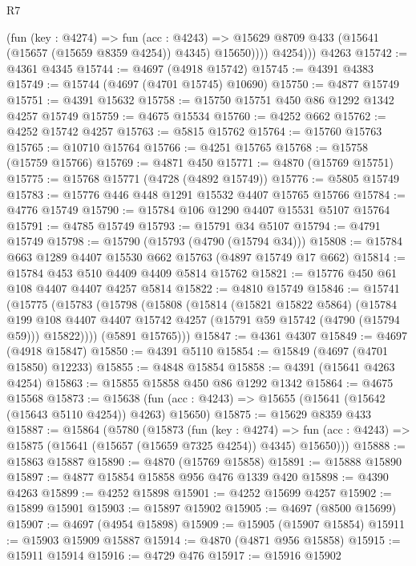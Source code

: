 \begin{lexlean}{R7}
\begin{coremodule}
              (fun (key : @4274) =>
              fun (acc : @4243) =>
              @15629 @8709 @433 (@15641 (@15657 (@15659 @8359 @4254)) @4345) @15650))))
          @4254)))
    @4263
@15742 := @4361 @4345
@15744 := @4697 (@4918 @15742)
@15745 := @4391 @4383
@15749 := @15744 (@4697 (@4701 @15745) @10690)
@15750 := @4877 @15749
@15751 := @4391 @15632
@15758 := @15750 @15751 @450 @86 @1292 @1342 @4257 @15749
@15759 := @4675 @15534
@15760 := @4252 @662
@15762 := @4252 @15742 @4257
@15763 := @5815 @15762
@15764 := @15760 @15763
@15765 := @10710 @15764
@15766 := @4251 @15765
@15768 := @15758 (@15759 @15766)
@15769 := @4871 @450
@15771 := @4870 (@15769 @15751)
@15775 := @15768 @15771 (@4728 (@4892 @15749))
@15776 := @5805 @15749
@15783 := @15776 @446 @448 @1291 @15532 @4407 @15765 @15766
@15784 := @4776 @15749
@15790 := @15784 @106 @1290 @4407 @15531 @5107 @15764
@15791 := @4785 @15749
@15793 := @15791 @34 @5107
@15794 := @4791 @15749
@15798 := @15790 (@15793 (@4790 (@15794 @34)))
@15808 := @15784 @663 @1289 @4407 @15530 @662 @15763 (@4897 @15749 @17 @662)
@15814 := @15784 @453 @510 @4409 @4409 @5814 @15762
@15821 := @15776 @450 @61 @108 @4407 @4407 @4257 @5814
@15822 := @4810 @15749
@15846 := @15741
    (@15775
      (@15783
        (@15798
          (@15808
            (@15814
              (@15821 @15822 @5864)
              (@15784
                @199
                @108
                @4407
                @4407
                @15742
                @4257
                (@15791 @59 @15742 (@4790 (@15794 @59)))
                @15822))))
        (@5891 @15765)))
@15847 := @4361 @4307
@15849 := @4697 (@4918 @15847)
@15850 := @4391 @5110
@15854 := @15849 (@4697 (@4701 @15850) @12233)
@15855 := @4848 @15854
@15858 := @4391 (@15641 @4263 @4254)
@15863 := @15855 @15858 @450 @86 @1292 @1342
@15864 := @4675 @15568
@15873 := @15638 (fun (acc : @4243) => @15655 (@15641 (@15642 (@15643 @5110 @4254)) @4263) @15650)
@15875 := @15629 @8359 @433
@15887 := @15864
    (@5780
      (@15873
        (fun (key : @4274) =>
        fun (acc : @4243) => @15875 (@15641 (@15657 (@15659 @7325 @4254)) @4345) @15650)))
@15888 := @15863 @15887
@15890 := @4870 (@15769 @15858)
@15891 := @15888 @15890
@15897 := @4877 @15854 @15858 @956 @476 @1339 @420
@15898 := @4390 @4263
@15899 := @4252 @15898
@15901 := @4252 @15699 @4257
@15902 := @15899 @15901
@15903 := @15897 @15902
@15905 := @4697 (@8500 @15699)
@15907 := @4697 (@4954 @15898)
@15909 := @15905 (@15907 @15854)
@15911 := @15903 @15909 @15887
@15914 := @4870 (@4871 @956 @15858)
@15915 := @15911 @15914
@15916 := @4729 @476
@15917 := @15916 @15902

\end{coremodule}
\end{lexlean}
